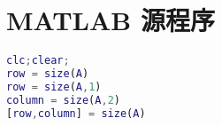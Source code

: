 \documentclass[a4paper,12pt]{article}
\theoremstyle{plain}
\begin{document}
\section*{MATLAB 源程序}
\begin{lstlisting}[language=matlab]
clc;clear;
row = size(A)
row = size(A,1)
column = size(A,2)
[row,column] = size(A)
\end{lstlisting}
\end{document}
